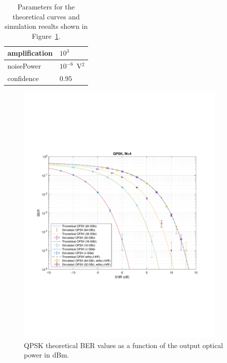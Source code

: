 \begin{refsection}
\begin{table}[H]
\begin{tabular}{|l|l|}
		amplification          & $10^3$                                                     \\ \hline
		noisePower			   & $10^{-6}$~V$^2$                             					\\ \hline
		confidence             & $0.95$                                                     \\ \hline
	\end{tabular}
	\caption{Parameters for the theoretical curves and simulation results shown in Figure~\ref{fig:ber_pseudorandom}.\label{tab:ber_pseudorandom}}
\end{table}

\begin{figure}[H]
	\centering
		\includegraphics[clip, trim=0cm 6cm 0cm 6cm, 
		width=0.9\textwidth]{./sdf/m_qam_system/figures/teor_vs_simul.pdf}
\caption{QPSK theoretical BER values as a function of the output optical power in dBm.\label{fig:ber_pseudorandom}}
\end{figure}


\end{refsection}
